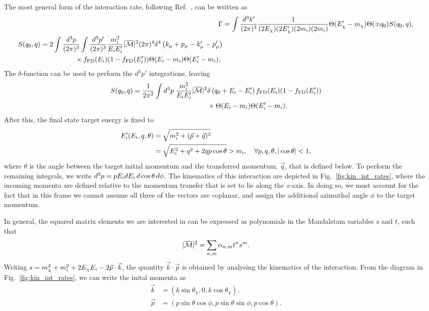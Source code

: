 The most general form of the interaction rate, following Ref.~\cite{Bertoni:2013bsa_dec_DarkMatterThermalization}, can be written as
\begin{align}
    \Gamma &= \int\frac{d^3 k'}{(2\pi)^3}\frac{1}{(2E_\chi)(2E_\chi')(2m_i)(2m_i)}\Theta(E_\chi' - m_\chi)\Theta(\pm q_0)S(q_0, q),\\
    \begin{split}
        S(q_0, q) & = 2\int\frac{d^3 p}{(2\pi)^3}\int\frac{d^3 p'}{(2\pi)^3}\frac{m_i^2}{E_i E_i'}|\overline{\mathcal M}|^2(2\pi)^4\delta^4\left( k_\mu + p_\mu - k_\mu' - p_\mu'\right)\\
        &\hspace{5em}\times f_{\rm FD}(E_i)(1 - f_{\rm FD}(E_i'))\Theta(E_i - m_i)\Theta(E_i' - m_i),
    \end{split}
\end{align}
The $\delta$-function can be used to perform the $d^3p'$ integrations, leaving
\begin{equation}
    \begin{split}
        S(q_0, q) = \frac{1}{2\pi^2}\int d^3p \; \frac{m_i^2}{E_i E_i'}|\overline{\mathcal M}|^2 &\delta\left( q_0 + E_i - E_i'\right) f_{\rm FD}(E_i)(1 - f_{\rm FD}(E_i'))\\
        &\times\Theta(E_i- m_i)\Theta(E_i' - m_i).
    \end{split}
\end{equation}
After this, the final state target energy is fixed to
\begin{align}
    E_i'(E_i,q,\theta) &= \sqrt{m_i^2+(\vec{p}+\vec{q})^2}\\
    &= \sqrt{E_i^2+q^2+2qp\cos\theta} > m_i, \quad\forall p,q,\theta, |\cos\theta|<1,
\end{align}
where $\theta$ is the angle between the target initial momentum and the transferred momentum, $\vec{q}$, that is defined below. To perform the remaining integrals, we write $d^3 p  = p E_i dE_i\, d\cos\theta\,d\phi$. The kinematics of this interaction are depicted in Fig.~\ref{fig:kin_int_rates}, where the incoming momenta are defined relative to the momentum transfer that is set to lie along the $z$-axis.  In doing so, we must account for the fact that in this frame we cannot assume all three of the vectors are coplanar, and assign the additional azimuthal angle $\phi$ to the target momentum. 

In general, the squared matrix elements we are interested in can be expressed as polynomials in the Mandalstam variables $s$ and $t$, such that
\begin{equation}
    |\overline{\mathcal M}|^2 = \sum_{n,m}\alpha_{n,m} t^n s^m.
\end{equation}
Writing $s = m_\chi^2 + m_i^2 + 2E_\chi E_i - 2\vec{p}\cdot \vec{k}$, the quantity $\vec{k}\cdot\vec{p}$ is obtained by analysing the kinematics of the interaction. From the diagram in Fig.~\ref{fig:kin_int_rates}, we can write the inital momenta as
\begin{align}
    \vec{k} & = (k\sin\theta_\chi, 0, k\cos\theta_\chi),\\
    \vec{p} & = (p\sin\theta \cos\phi, p\sin\theta \sin\phi, p\cos\theta).
\end{align}

